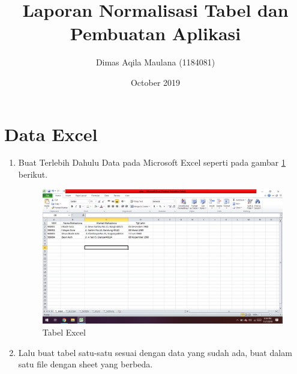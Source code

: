 \documentclass[12pt, times new roman, a4paper]{article}
\title{Laporan Normalisasi Tabel dan Pembuatan Aplikasi}
\author{Dimas Aqila Maulana (1184081)}
\date{October 2019}
\begin{document}
\maketitle
\section{Data Excel}
\begin{enumerate}
    \item Buat Terlebih Dahulu Data pada Microsoft Excel seperti pada gambar \ref{excel} berikut.
    \begin{figure}[!htbp]
        \centering
        \includegraphics[scale=0.25]{figures/excel.png}
        \caption{Tabel Excel}
        \label{excel}
    \end{figure}
    \item Lalu buat tabel satu-satu sesuai dengan data yang sudah ada, buat dalam satu file dengan sheet yang berbeda.
\end{enumerate}
\end{document}
